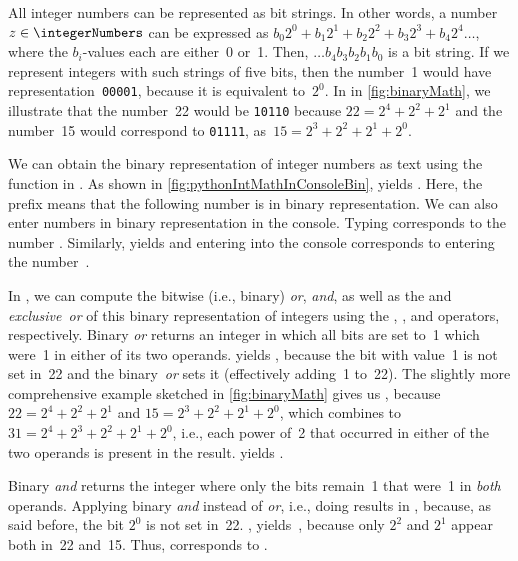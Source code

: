 All integer numbers can be represented as bit strings.
In other words, a number $z\in\integerNumbers$ can be expressed as $b_0 2^0 + b_1 2^1 + b_2 2^2 + b_3 2^3 + b_4 2^4\dots$, where the $b_i$-values each are either~0 or~1.
Then, $\dots b_4 b_3 b_2 b_1 b_0$ is a bit string.
If we represent integers with such strings of five bits, then the number~1 would have representation~\texttt{00001}, because it is equivalent to~$2^0$.
In in \cref{fig:binaryMath}, we illustrate that the number~22 would be \texttt{10110} because $22=2^4+2^2+2^1$ and the number~15 would correspond to \texttt{01111}, as~$15=2^3+2^2+2^1+2^0$.

We can obtain the binary representation of integer numbers as text using the  function in \python.
As shown in \cref{fig:pythonIntMathInConsoleBin},  yields .
Here, the  prefix means that the following number is in binary representation.
We can also enter numbers in binary representation in the console.
Typing  corresponds to the number .
Similarly,  yields  and entering  into the console corresponds to entering the number~.

In \python, we can compute the bitwise (i.e., binary) \emph{or}, \emph{and}, as well as the and \emph{exclusive~or} of this binary representation of integers using the \pythonil{|}, \pythonil{&}, and \pythonil{^} operators, respectively.
Binary \emph{or} returns an integer in which all bits are set to~1 which were~1 in either of its two operands.
 yields , because the bit with value~1 is not set in~22 and the binary~\emph{or} sets it (effectively adding~1 to~22).
The slightly more comprehensive example  sketched in \cref{fig:binaryMath} gives us , because $22=2^4+2^2+2^1$ and $15=2^3+2^2+2^1+2^0$, which \pythonil{|} combines to $31=2^4+2^3+2^2+2^1+2^0$, i.e., each power of~2 that occurred in either of the two operands is present in the result.
 yields .

Binary \emph{and} returns the integer where only the bits remain~1 that were~1 in \emph{both} operands.
Applying binary \emph{and} instead of \emph{or}, i.e., doing  results in , because, as said before, the bit $2^0$ is not set in~22.
, yields~, because only $2^2$ and $2^1$ appear both in~22 and~15.
Thus,  corresponds to .

